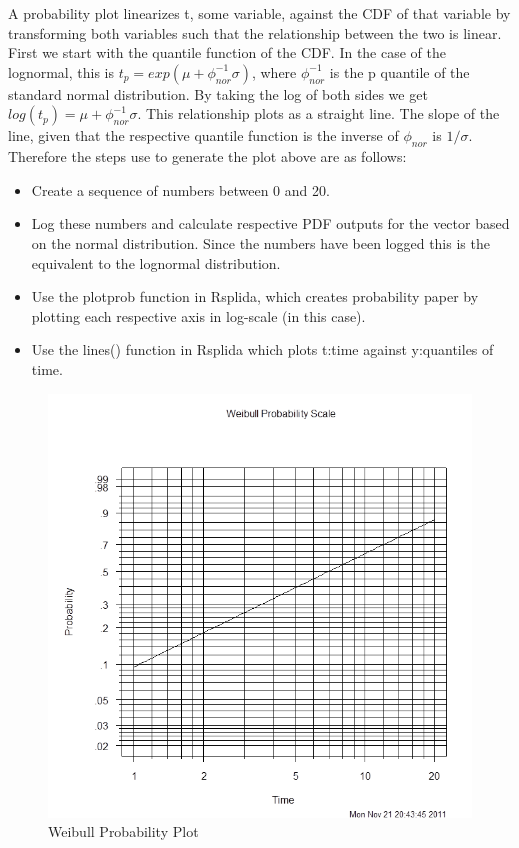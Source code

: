 \documentclass{article}
\begin{document}
A probability plot linearizes t, some variable, against the CDF of that variable by transforming both variables such that the relationship between the two is linear.  First we start with the quantile function of the CDF.  In the case of the lognormal, this is \(t_p = exp(\mu + \phi_{nor}^{-1} \sigma)\), where \(\phi_{nor}^{-1}\) is the p quantile of the standard normal distribution.  By taking the log of both sides we get \(log(t_p) = \mu + \phi_{nor}^{-1} \sigma\).  This relationship plots as a straight line.  The slope of the line, given that the respective quantile function is the inverse of  \(\phi_{nor}\) is \(1/\sigma\).\\

Therefore the steps use to generate the plot above are as follows:\\
\begin{itemize}
\item Create a sequence of numbers between 0 and 20.\\

\item Log these numbers and calculate respective PDF outputs for the vector based on the normal distribution.  Since the numbers have been logged this is the equivalent to the lognormal distribution.

\item Use the plotprob function in Rsplida, which creates probability paper by plotting each respective axis in log-scale (in this case).

\item Use the lines() function in Rsplida which plots t:time against y:quantiles of time.
\end{itemize}


\begin{figure}
  \centering
  \includegraphics[width = 5in]{weibull_graph_1.png}
  \caption{Weibull Probability Plot}
\end{figure}
\FloatBarrier
\end{document}
